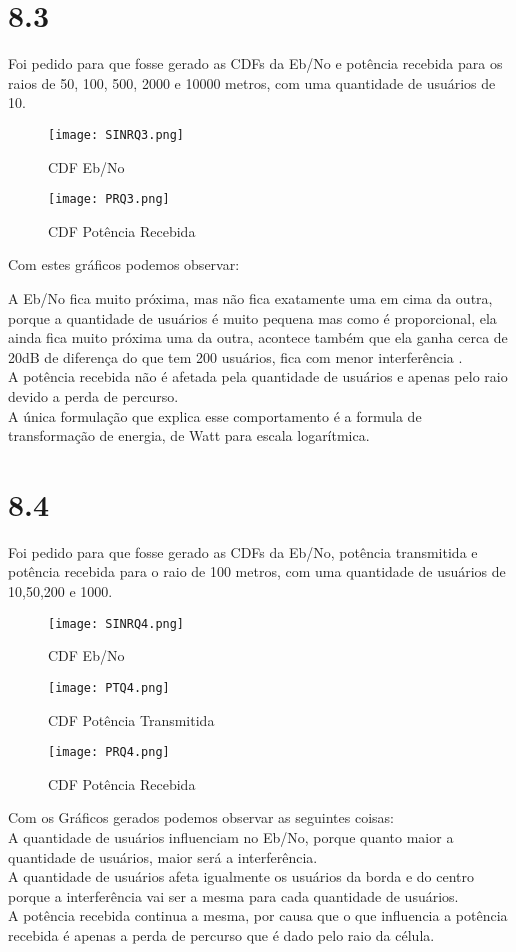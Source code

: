 \documentclass[12pt]{article}
\begin{document}
\section{\huge 8.3}
Foi pedido para que fosse gerado as CDFs da Eb/No e potência recebida para os raios de  50, 100, 500, 2000 e 10000 metros, com uma quantidade de usuários de 10.
\begin{figure}[h]
    \centering
    \texttt{[image: SINRQ3.png]}
    \caption{CDF Eb/No}
    \label{fig:my_label}
\end{figure}
\FloatBarrier
\begin{figure}[h]
    \centering
    \texttt{[image: PRQ3.png]}
    \caption{CDF Potência Recebida}
    \label{fig:my_label}
\end{figure}
\FloatBarrier
Com estes gráficos podemos observar:

A Eb/No fica muito próxima, mas não fica exatamente uma em cima da outra, porque a quantidade de usuários é muito pequena mas como é proporcional, ela ainda fica muito próxima uma da outra, acontece também que ela ganha cerca de 20dB de diferença do que tem 200 usuários, fica com menor interferência .\\
A potência recebida não é afetada pela quantidade de usuários e apenas pelo raio devido a perda de percurso.\\
A única formulação que explica esse comportamento é a formula de transformação de energia, de Watt para escala logarítmica. 

\section{\huge 8.4}
Foi pedido para que fosse gerado as CDFs da Eb/No, potência transmitida e potência recebida para o raio de 100 metros, com uma quantidade de usuários de 10,50,200 e 1000.
\begin{figure}[h]
    \centering
    \texttt{[image: SINRQ4.png]}
    \caption{CDF Eb/No}
    \label{fig:my_label}
\end{figure}
\begin{figure}[h]
    \centering
    \texttt{[image: PTQ4.png]}
    \caption{CDF Potência Transmitida}
    \label{fig:my_label}
\end{figure}
\begin{figure}[h]
    \centering
    \texttt{[image: PRQ4.png]}
    \caption{CDF Potência Recebida}
    \label{fig:my_label}
\end{figure}
\FloatBarrier
Com os Gráficos gerados podemos observar as seguintes coisas:\\
A quantidade de usuários influenciam no Eb/No, porque quanto maior a quantidade de usuários, maior será a interferência. \\
A quantidade de usuários afeta igualmente os usuários da borda e do centro porque a interferência vai ser a mesma para cada quantidade de usuários.\\
A potência recebida continua a mesma, por causa que o que influencia a potência recebida é apenas a perda de percurso que é dado pelo raio da célula. 
%
%
\end{document}
